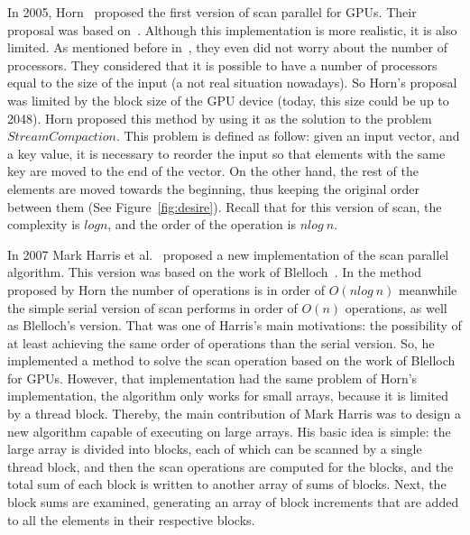 \documentclass[Ingles]{ic-tese-v1}
\begin{document}
In 2005, Horn~\cite{GPUGems2} proposed the first version of scan parallel
for GPUs. Their proposal was based on~\cite{dataparallel}. Although this
implementation is more realistic, it is also  limited. As  mentioned before in~\cite{dataparallel},
they even did not worry about the number of processors.
They considered that it is possible to have a number of processors equal to the
size of the input (a not real situation nowadays).
So Horn's proposal was limited by the block size of the GPU device (today, this size could
be up to 2048). Horn proposed this method by using it
as the solution to the problem $Stream Compaction$. This problem is defined
as follow: given an input vector, and a key value,  it is necessary to
reorder the input so that elements with the same key are moved to the end of
the vector. On the other hand, the rest of the elements are moved towards the beginning,
thus keeping the original order between them (See Figure~\ref{fig:desire}). Recall
that for this version of scan, the complexity is $log n$, and the order of
the operation is $n log\ n$.

In 2007 Mark Harris et al.~\cite{harris2007parallel} proposed a new
implementation of the scan parallel algorithm. This version was based on the work
of Blelloch~\cite{ScanAsPrimitive}. In the method proposed by Horn the number
of operations is in order of $O(n log\ n)$ meanwhile the simple serial version
of scan performs in order of $O(n)$ operations, as well as Blelloch's version.
That was one of Harris's main motivations: the possibility of at least achieving
the same order of operations than the serial version. So, he implemented a
method to solve the scan operation based on the work of Blelloch for GPUs.
However, that implementation had the same problem of Horn's implementation, the
algorithm only works for small arrays, because it is limited by a thread
block. Thereby, the main contribution of Mark Harris was to design a new
algorithm capable of executing on large arrays. His basic idea is simple:
the large array is divided into blocks, each of which
can be scanned by a single thread block, and then the scan operations are
computed for the blocks, and the total sum of each block is written to another
array of sums of blocks. Next, the block sums are examined, generating an array
of block increments that are added to all the elements in their respective
blocks.
\end{document}

